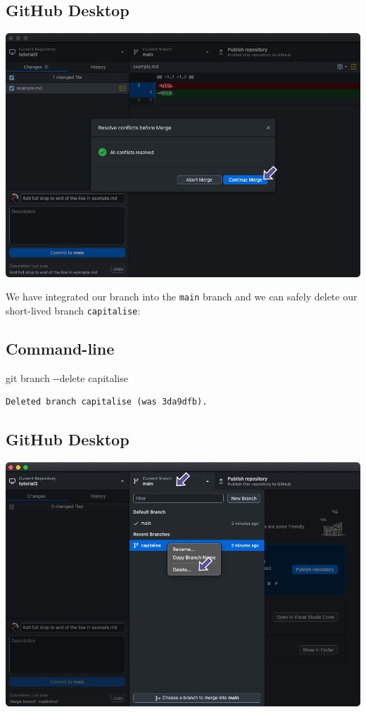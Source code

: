 \documentclass[
  letterpaper,
  DIV=11,
  numbers=noendperiod]{scrartcl}
\newenvironment{Shaded}{\begin{snugshade}}{\end{snugshade}}
\newcommand{\AttributeTok}[1]{\textcolor[rgb]{0.40,0.45,0.13}{#1}}
\newcommand{\FunctionTok}[1]{\textcolor[rgb]{0.28,0.35,0.67}{#1}}
\newcommand{\NormalTok}[1]{\textcolor[rgb]{0.00,0.23,0.31}{#1}}
\begin{document}
\subsection{GitHub Desktop}

\includegraphics{images/image56.png}

We have integrated our branch into the \texttt{main} branch and we can
safely delete our short-lived branch \texttt{capitalise}:

\subsection{Command-line}

\begin{Shaded}
\begin{Highlighting}[]
\FunctionTok{git}\NormalTok{ branch }\AttributeTok{{-}{-}delete}\NormalTok{ capitalise}
\end{Highlighting}
\end{Shaded}

\begin{verbatim}
Deleted branch capitalise (was 3da9dfb).
\end{verbatim}

\subsection{GitHub Desktop}

\includegraphics{images/image57.png}
\end{document}
